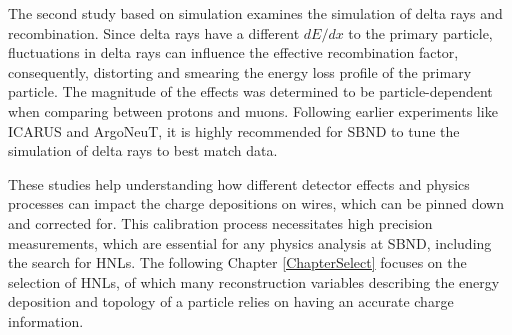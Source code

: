 The second study based on simulation examines the simulation of delta rays and recombination.
Since delta rays have a different $dE/dx$ to the primary particle, fluctuations in delta rays can influence the effective recombination factor, consequently, distorting and smearing the energy loss profile of the primary particle.
The magnitude of the effects was determined to be particle-dependent when comparing between protons and muons.
Following earlier experiments like ICARUS and ArgoNeuT, it is highly recommended for SBND to tune the simulation of delta rays to best match data.

These studies help understanding how different detector effects and physics processes can impact the charge depositions on wires, which can be pinned down and corrected for.
This calibration process necessitates high precision measurements, which are essential for any physics analysis at SBND, including the search for HNLs.
The following Chapter \ref{ChapterSelect} focuses on the selection of HNLs, of which many reconstruction variables describing the energy deposition and topology of a particle relies on having an accurate charge information. 

